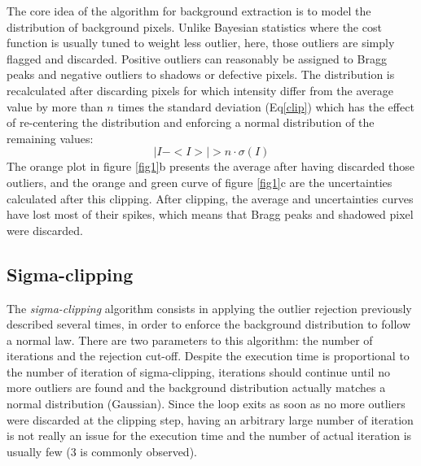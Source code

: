 \documentclass[a4paper,12pt,oneside]{article}              %
\begin{document}
The core idea of the algorithm for background extraction is to model the distribution of background pixels. Unlike Bayesian statistics \cite{Sivia2006} where the cost function is usually tuned to weight less outlier, here, those outliers are simply flagged and discarded.
Positive outliers can reasonably be assigned to Bragg peaks and negative outliers to shadows or defective pixels. 
The distribution is recalculated  after discarding pixels for which intensity differ from the average value by more than $n$ times the standard deviation (Eq\ref{clip}) which has the effect of re-centering the distribution and enforcing a normal distribution of the remaining values:
\begin{equation}
\label{clip}
|I - <I>| > n \cdot \sigma(I)
\end{equation}
The orange plot in figure \ref{fig1}b presents the average after having discarded those outliers, and the orange and green curve of figure \ref{fig1}c are the uncertainties calculated after this clipping. 
After clipping, the average and uncertainties curves have lost most of their spikes, which means that Bragg peaks and shadowed pixel were discarded.
 
\subsection{Sigma-clipping}
The \textit{sigma-clipping} algorithm consists in applying the outlier rejection previously described several times, in order to enforce the background distribution to follow a normal law.
There are two parameters to this algorithm: the number of iterations and the rejection cut-off.
Despite the execution time is proportional to the number of iteration of sigma-clipping, iterations should continue until no more outliers are found and the 
background distribution actually matches a normal distribution (Gaussian). 
Since the loop exits as soon as no more outliers were discarded at the clipping step, having an arbitrary large number of iteration is not really an issue for the execution time and the number of actual iteration is usually few (3 is commonly observed).       
\end{document}
